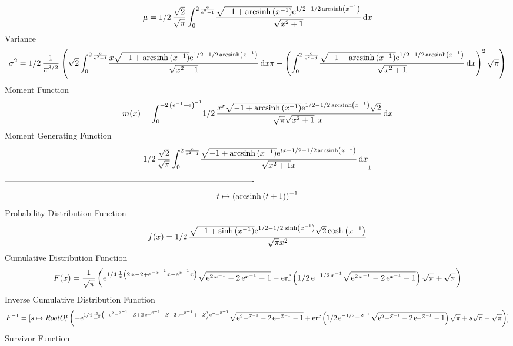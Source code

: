 \documentclass[12pt]{article}
\begin{document}
 $$ \mu=1/2\,{\frac {\sqrt {2}}{\sqrt {\pi}}\int_{0}^{2\,{\frac {{\rm e}}{{
{\rm e}^{2}}-1}}}\!{\frac {\sqrt {-1+{\rm arcsinh} \left({x}^{-1}
\right)}{{\rm e}^{1/2-1/2\,{\rm arcsinh} \left({x}^{-1}\right)}}}{
\sqrt {{x}^{2}+1}}}\,{\rm d}x}
$$ Variance 
 $$ \sigma^2 = 1/2\,{\frac {1}{{\pi}^{3/2}} \left( \sqrt {2}\int_{0}^{2\,{\frac {{
\rm e}}{{{\rm e}^{2}}-1}}}\!{\frac {x\sqrt {-1+{\rm arcsinh} \left({x}
^{-1}\right)}{{\rm e}^{1/2-1/2\,{\rm arcsinh} \left({x}^{-1}\right)}}
}{\sqrt {{x}^{2}+1}}}\,{\rm d}x\pi- \left( \int_{0}^{2\,{\frac {{\rm e
}}{{{\rm e}^{2}}-1}}}\!{\frac {\sqrt {-1+{\rm arcsinh} \left({x}^{-1}
\right)}{{\rm e}^{1/2-1/2\,{\rm arcsinh} \left({x}^{-1}\right)}}}{
\sqrt {{x}^{2}+1}}}\,{\rm d}x \right) ^{2}\sqrt {\pi} \right) }
$$Moment Function 
 $$ m(x) = \int_{0}^{-2\, \left( {{\rm e}^{-1}}-{\rm e} \right) ^{-1}}\!1/2\,{
\frac {{x}^{r}\sqrt {-1+{\rm arcsinh} \left({x}^{-1}\right)}{{\rm e}^{
1/2-1/2\,{\rm arcsinh} \left({x}^{-1}\right)}}\sqrt {2}}{\sqrt {\pi}
\sqrt {{x}^{2}+1} \left| x \right| }}\,{\rm d}x
$$ Moment Generating Function 
 $$1/2\,{\frac {\sqrt {2}}{\sqrt {\pi}}\int_{0}^{2\,{\frac {{\rm e}}{{
{\rm e}^{2}}-1}}}\!{\frac {\sqrt {-1+{\rm arcsinh} \left({x}^{-1}
\right)}{{\rm e}^{tx+1/2-1/2\,{\rm arcsinh} \left({x}^{-1}\right)}}}{
\sqrt {{x}^{2}+1}x}}\,{\rm d}x}_{{1}}
$$-------------------------------------------------------------------------------------------  \\$$t\mapsto  \left( {\rm arcsinh} \left(t+1\right) \right) ^{-1}
$$Probability Distribution Function 
$$  f(x)=1/2\,{\frac {\sqrt {-1+\sinh \left( {x}^{-1} \right) }{{\rm e}^{1/2-1/
2\,\sinh \left( {x}^{-1} \right) }}\sqrt {2}\cosh \left( {x}^{-1}
 \right) }{\sqrt {\pi}{x}^{2}}}
$$Cumulative Distribution Function  
 $$F(x)={\frac {1}{\sqrt {\pi}} \left( {{\rm e}^{1/4\,{\frac {1}{x} \left( 2\,
x-2+{{\rm e}^{-{x}^{-1}}}x-{{\rm e}^{{x}^{-1}}}x \right) }}}\sqrt {{
{\rm e}^{2\,{x}^{-1}}}-2\,{{\rm e}^{{x}^{-1}}}-1}-{\rm erf} \left(1/2
\,{{\rm e}^{-1/2\,{x}^{-1}}}\sqrt {{{\rm e}^{2\,{x}^{-1}}}-2\,{{\rm e}
^{{x}^{-1}}}-1}\right)\sqrt {\pi}+\sqrt {\pi} \right) }
$$ Inverse Cumulative Distribution Function 
  $$F^{-1} = [s\mapsto {\it RootOf} \left( -{{\rm e}^{1/4\,{\frac {1}{{\it \_Z}}
 \left( -{{\rm e}^{2\,{{\it \_Z}}^{-1}}}{\it \_Z}+2\,{{\rm e}^{{{\it 
\_Z}}^{-1}}}{\it \_Z}-2\,{{\rm e}^{{{\it \_Z}}^{-1}}}+{\it \_Z}
 \right) {{\rm e}^{-{{\it \_Z}}^{-1}}}}}}\sqrt {{{\rm e}^{2\,{{\it \_Z
}}^{-1}}}-2\,{{\rm e}^{{{\it \_Z}}^{-1}}}-1}+{\rm erf} \left(1/2\,{
{\rm e}^{-1/2\,{{\it \_Z}}^{-1}}}\sqrt {{{\rm e}^{2\,{{\it \_Z}}^{-1}}
}-2\,{{\rm e}^{{{\it \_Z}}^{-1}}}-1}\right)\sqrt {\pi}+s\sqrt {\pi}-
\sqrt {\pi} \right) ]
$$Survivor Function 
\end{document}
